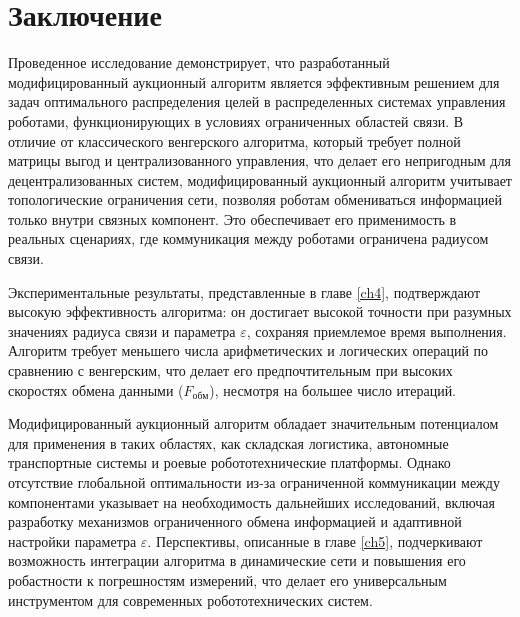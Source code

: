 \chapter*{Заключение} \label{ch-conclusion}


Проведенное исследование демонстрирует, что разработанный модифицированный аукционный алгоритм является эффективным решением для задач оптимального распределения целей в распределенных системах управления роботами, функционирующих в условиях ограниченных областей связи. В отличие от классического венгерского алгоритма, который требует полной матрицы выгод и централизованного управления, что делает его непригодным для децентрализованных систем, модифицированный аукционный алгоритм учитывает топологические ограничения сети, позволяя роботам обмениваться информацией только внутри связных компонент. Это обеспечивает его применимость в реальных сценариях, где коммуникация между роботами ограничена радиусом связи.

Экспериментальные результаты, представленные в главе \ref{ch4}, подтверждают высокую эффективность алгоритма: он достигает высокой точности при разумных значениях радиуса связи и параметра $\varepsilon$, сохраняя приемлемое время выполнения. Алгоритм требует меньшего числа арифметических и логических операций по сравнению с венгерским, что делает его предпочтительным при высоких скоростях обмена данными ($F_{\text{обм}}$), несмотря на большее число итераций.

Модифицированный аукционный алгоритм обладает значительным потенциалом для применения в таких областях, как складская логистика, автономные транспортные системы и роевые робототехнические платформы. Однако отсутствие глобальной оптимальности из-за ограниченной коммуникации между компонентами указывает на необходимость дальнейших исследований, включая разработку механизмов ограниченного обмена информацией и адаптивной настройки параметра $\varepsilon$. Перспективы, описанные в главе  \ref{ch5}, подчеркивают возможность интеграции алгоритма в динамические сети и повышения его робастности к погрешностям измерений, что делает его универсальным инструментом для современных робототехнических систем.
